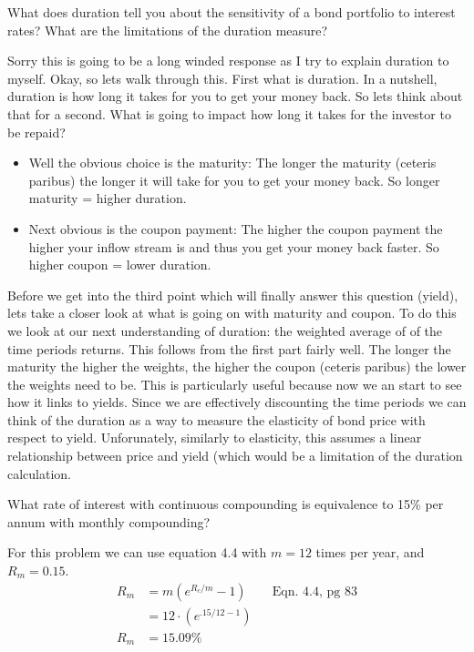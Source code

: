 \documentclass[12pt]{article}
\newenvironment{problem}[3][Problem]{\begin{trivlist}
\item[\hskip \labelsep {\bfseries #1}\hskip \labelsep {\bfseries #2.}]}{\end{trivlist}}
\begin{document}
\begin{problem}{4.8}. What does duration tell you about the sensitivity of a bond portfolio to interest rates? What are the limitations of the duration measure?

Sorry this is going to be a long winded response as I try to explain duration to myself. Okay, so lets walk through this. First what is duration. In a nutshell, duration is how long it takes for you to get your money back. So lets think about that for a second. What is going to impact how long it takes for the investor to be repaid?
\begin{itemize}
\item Well the obvious choice is the maturity: The longer the maturity (ceteris paribus) the longer it will take for you to get your money back. So longer maturity = higher duration. 
\item Next obvious is the coupon payment: The higher the coupon payment the higher your inflow stream is and thus you get your money back faster. So higher coupon = lower duration.
\end{itemize}
Before we get into the third point which will finally answer this question (yield), lets take a closer look at what is going on with maturity and coupon. To do this we look at our next understanding of duration: the weighted average of of the time periods returns. This follows from the first part fairly well. The longer the maturity the higher the weights, the higher the coupon (ceteris paribus) the lower the weights need to be. This is particularly useful because now we an start to see how it links to yields. Since we are effectively discounting the time periods we can think of the duration as a way to measure the elasticity of bond price with respect to yield. Unforunately, similarly to elasticity, this assumes a linear relationship between price and yield (which would be a limitation of the duration calculation. 
\end{problem}

\begin{problem}{4.9}. What rate of interest with continuous compounding is equivalence to 15\% per annum with monthly compounding?

For this problem we can use equation 4.4 with $m=12$ times per year, and $R_m= 0.15$.
\begin{align*}
R_m &= m(e^{R_c/m} - 1) && \text{Eqn. 4.4, pg 83} \\ 
&= 12 \cdot (e^{.15/12-1}) \\ 
R_m &= 15.09\%
\end{align*}
\end{problem}
\end{document}
